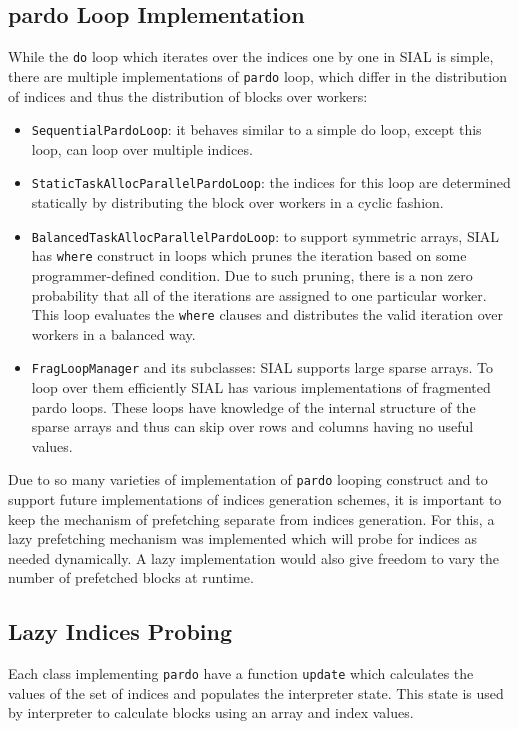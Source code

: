 \subsection{pardo Loop Implementation}
While the \texttt{do} loop which iterates over the indices one by one in SIAL is
simple, there are multiple implementations of \texttt{pardo} loop, which differ
in the distribution of indices and thus the distribution of blocks over workers:
\begin{itemize}
\item \texttt{SequentialPardoLoop}: it behaves similar to a simple do loop,
  except this loop, can loop over multiple indices.
\item \texttt{StaticTaskAllocParallelPardoLoop}: the indices for this loop are
  determined statically by distributing the block over workers in a cyclic fashion.
\item \texttt{BalancedTaskAllocParallelPardoLoop}: to support symmetric arrays,
  SIAL has \texttt{where} construct in loops which prunes the iteration based on
  some programmer-defined condition. Due to such pruning, there is a non zero
  probability that all of the iterations are assigned to one particular worker.
  This loop evaluates the \texttt{where} clauses and distributes the valid iteration
  over workers in a balanced way.
\item \texttt{FragLoopManager} and its subclasses: SIAL supports large sparse
  arrays. To loop over them efficiently SIAL has various implementations of
  fragmented pardo loops. These loops have knowledge of the internal structure of the
  sparse arrays and thus can skip over rows and columns having no useful values.
\end{itemize}
Due to so many varieties of implementation of \texttt{pardo} looping construct
and to support future implementations of indices generation schemes, it is
important to keep the mechanism of prefetching separate from indices generation.
For this, a lazy prefetching mechanism was implemented which will probe for indices
as needed dynamically. A lazy implementation would also give freedom to vary the number
of prefetched blocks at runtime.

\subsection{Lazy Indices Probing}
Each class implementing \texttt{pardo} have a function \texttt{update} which
calculates the values of the set of indices and populates the interpreter state. This
state is used by interpreter to calculate blocks using an array and index values.

